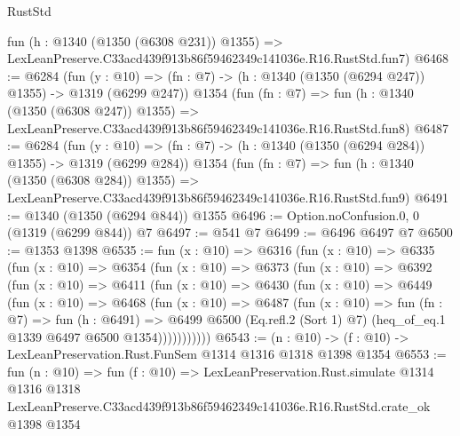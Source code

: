 \begin{lexlean}{RustStd}
\begin{coremodule}
    fun (h : @1340 (@1350 (@6308 @231)) @1355) =>
    LexLeanPreserve.C33acd439f913b86f59462349c141036e.R16.RustStd.fun7)
@6468 := @6284
    (fun (y : @10) => (fn : @7) -> (h : @1340 (@1350 (@6294 @247)) @1355) -> @1319 (@6299 @247))
    @1354
    (fun (fn : @7) =>
    fun (h : @1340 (@1350 (@6308 @247)) @1355) =>
    LexLeanPreserve.C33acd439f913b86f59462349c141036e.R16.RustStd.fun8)
@6487 := @6284
    (fun (y : @10) => (fn : @7) -> (h : @1340 (@1350 (@6294 @284)) @1355) -> @1319 (@6299 @284))
    @1354
    (fun (fn : @7) =>
    fun (h : @1340 (@1350 (@6308 @284)) @1355) =>
    LexLeanPreserve.C33acd439f913b86f59462349c141036e.R16.RustStd.fun9)
@6491 := @1340 (@1350 (@6294 @844)) @1355
@6496 := Option.noConfusion.{0, 0} (@1319 (@6299 @844)) @7
@6497 := @541 @7
@6499 := @6496 @6497 @7
@6500 := @1353 @1398
@6535 := fun (x : @10) =>
  @6316
    (fun (x : @10) =>
    @6335
      (fun (x : @10) =>
      @6354
        (fun (x : @10) =>
        @6373
          (fun (x : @10) =>
          @6392
            (fun (x : @10) =>
            @6411
              (fun (x : @10) =>
              @6430
                (fun (x : @10) =>
                @6449
                  (fun (x : @10) =>
                  @6468
                    (fun (x : @10) =>
                    @6487
                      (fun (x : @10) =>
                      fun (fn : @7) =>
                      fun (h : @6491) =>
                      @6499
                        @6500
                        (Eq.refl.{2} (Sort 1) @7)
                        (heq_of_eq.{1} @1339 @6497 @6500 @1354)))))))))))
@6543 := (n : @10) -> (f : @10) -> LexLeanPreservation.Rust.FunSem @1314 @1316 @1318 @1398 @1354
@6553 := fun (n : @10) =>
  fun (f : @10) =>
  LexLeanPreservation.Rust.simulate
    @1314
    @1316
    @1318
    LexLeanPreserve.C33acd439f913b86f59462349c141036e.R16.RustStd.crate_ok
    @1398
    @1354
\end{coremodule}
\end{lexlean}
